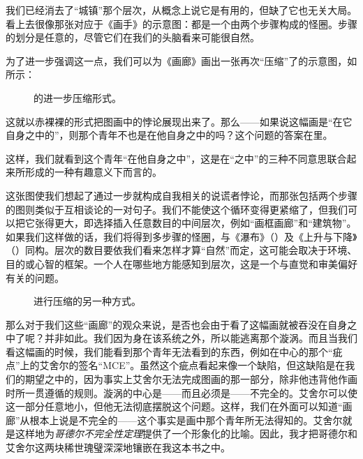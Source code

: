 我们已经消去了“城镇”那个层次，从概念上说它是有用的，但缺了它也无关大局。看上去很像那张对应于《画手》的示意图：都是一个由两个步骤构成的怪圈。步骤的划分是任意的，尽管它们在我们的头脑看来可能很自然。

为了进一步强调这一点，我们可以为《画廊》画出一张再次“压缩”了的示意图，如所示：

\begin{figure}
\caption{的进一步压缩形式。}
\end{figure}

这就以赤裸裸的形式把图画中的悖论展现出来了。那么——如果说这幅画是“在它自身之中的”，则那个青年不也是在他自身之中的吗？这个问题的答案在里。

这样，我们就看到这个青年“在他自身之中”，这是在“之中”的三种不同意思联合起来所形成的一种有趣意义下而言的。

这张图使我们想起了通过一步就构成自我相关的说谎者悖论，而那张包括两个步骤的图则类似于互相谈论的一对句子。我们不能使这个循环变得更紧缩了，但我们可以把它张得更大，即选择插入任意数目的中间层次，例如“画框画廊”和“建筑物”。如果我们这样做的话，我们将得到多步骤的怪圈，与《瀑布》（）及《上升与下降》（）同构。层次的数目要依我们看来怎样才算“自然”而定，这可能会取决于环境、目的或心智的框架。一个人在哪些地方能感知到层次，这是一个与直觉和审美偏好有关的问题。

\begin{figure}
\caption[对进行压缩的另一种方式。]
  {进行压缩的另一种方式。}
\end{figure}

那么对于我们这些“画廊”的观众来说，是否也会由于看了这幅画就被吞没在自身之中了呢？并非如此。我们因为身在该系统之外，所以能逃离那个漩涡。而且当我们看这幅画的时候，我们能看到那个青年无法看到的东西，例如在中心的那个“疵点”上的艾舍尔的签名“MCE”。虽然这个疵点看起来像一个缺陷，但这缺陷是在我们的期望之中的，因为事实上艾舍尔无法完成图画的那一部分，除非他违背他作画时所一贯遵循的规则。漩涡的中心是——而且必须是——不完全的。艾舍尔可以使这一部分任意地小，但他无法彻底摆脱这个问题。这样，我们在外面可以知道“画廊”从根本上说是不完全的——这个事实是画中那个青年所无法得知的。艾舍尔就是这样地为\emph{哥德尔不完全性定理}提供了一个形象化的比喻。因此，我才把哥德尔和艾舍尔这两块稀世瑰璧深深地镶嵌在我这本书之中。

